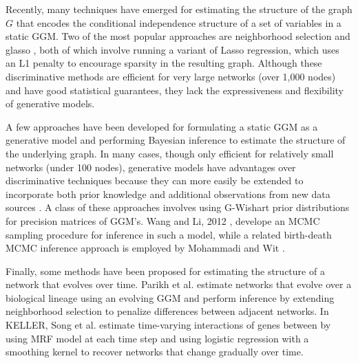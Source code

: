 \documentclass{article}
\begin{document}


Recently, many techniques have emerged for estimating the structure of the graph $G$ that encodes the conditional independence structure of a set of variables in a static GGM. Two of the most popular approaches are neighborhood selection \cite{meinshausen2006high} and glasso \cite{friedman2008sparse}, both of which involve running a variant of Lasso regression, which uses an L1 penalty to encourage sparsity in the resulting graph. Although these discriminative methods are efficient for very large networks (over 1,000 nodes) and have good statistical guarantees, they lack the expressiveness and flexibility of generative models.

A few approaches have been developed for formulating a static GGM as a generative model and performing Bayesian inference to estimate the structure of the underlying graph. In many cases, though only efficient for relatively small networks (under 100 nodes), generative models have advantages over discriminative techniques because they can more easily be extended to incorporate both prior knowledge and additional observations from new data sources \cite{roverato2002hyper,jones2005experiments,green1995reversible}. A class of these approaches involves using G-Wishart prior distributions for precision matrices of GGM's. Wang and Li, 2012 \cite{wang2012efficient}, develope an MCMC sampling procedure for inference in such a model, while a related birth-death MCMC inference approach is employed by Mohammadi and Wit \cite{mohammadi2012efficient}.

Finally, some methods have been proposed for estimating the structure of a network that evolves over time. Parikh et al. \cite{parikh2011treegl} estimate networks that evolve over a biological lineage using an evolving GGM and perform inference by extending neighborhood selection to penalize differences between adjacent networks. In KELLER, Song et al. \cite{song2009keller} estimate time-varying interactions of genes between by using MRF model at each time step and using logistic regression with a smoothing kernel to recover networks that change gradually over time.
\end{document}
